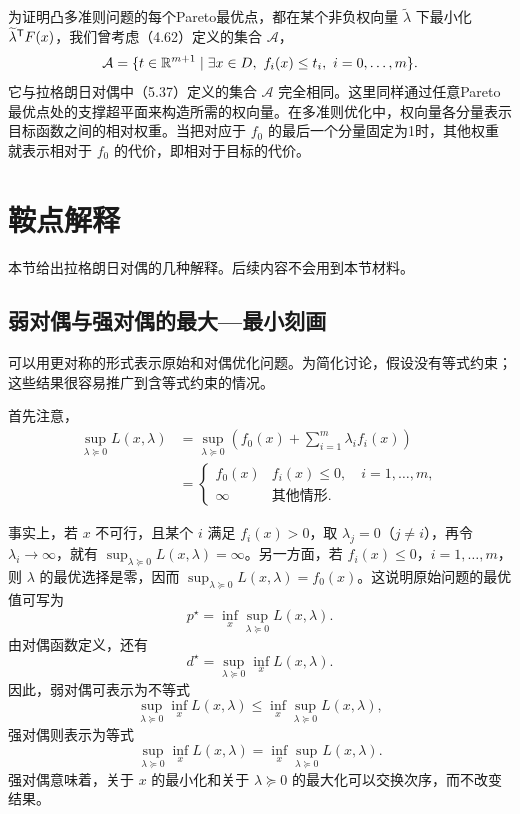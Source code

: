 为证明凸多准则问题的每个Pareto最优点，都在某个非负权向量 $\widetilde\lambda$ 下最小化 $\widetilde\lambda^\mathsf T F(x)$，我们曾考虑（4.62）定义的集合 $\mathcal A$，
\[
\mathcal A=\{t\in\mathbb R^{m+1}\mid\exists x\in D,\ f_i(x)\le t_i,\ i=0,\ldots,m\}.
\]
它与拉格朗日对偶中（5.37）定义的集合 $\mathcal A$ 完全相同。这里同样通过任意Pareto最优点处的支撑超平面来构造所需的权向量。在多准则优化中，权向量各分量表示目标函数之间的相对权重。当把对应于 $f_0$ 的最后一个分量固定为1时，其他权重就表示相对于 $f_0$ 的代价，即相对于目标的代价。

\section{鞍点解释}
本节给出拉格朗日对偶的几种解释。后续内容不会用到本节材料。

\subsection{弱对偶与强对偶的最大—最小刻画}
可以用更对称的形式表示原始和对偶优化问题。为简化讨论，假设没有等式约束；这些结果很容易推广到含等式约束的情况。

首先注意，
\[
\begin{aligned}
\sup_{\lambda\succeq0}L(x,\lambda)
&=\sup_{\lambda\succeq0}\left(f_0(x)+\sum_{i=1}^m\lambda_i f_i(x)\right)\\
&=\begin{cases}
f_0(x)&f_i(x)\le0,\quad i=1,\ldots,m,\\
\infty&\text{其他情形}.
\end{cases}
\end{aligned}
\]

事实上，若 $x$ 不可行，且某个 $i$ 满足 $f_i(x)>0$，取 $\lambda_j=0$（$j\ne i$），再令 $\lambda_i\to\infty$，就有 $\sup_{\lambda\succeq0}L(x,\lambda)=\infty$。另一方面，若 $f_i(x)\le0$，$i=1,\ldots,m$，则 $\lambda$ 的最优选择是零，因而 $\sup_{\lambda\succeq0}L(x,\lambda)=f_0(x)$。这说明原始问题的最优值可写为
\[
p^\star=\inf_x\sup_{\lambda\succeq0}L(x,\lambda).
\]
由对偶函数定义，还有
\[
d^\star=\sup_{\lambda\succeq0}\inf_xL(x,\lambda).
\]
因此，弱对偶可表示为不等式
\begin{equation}
\sup_{\lambda\succeq0}\inf_xL(x,\lambda)
\le\inf_x\sup_{\lambda\succeq0}L(x,\lambda),\tag{5.45}
\end{equation}
强对偶则表示为等式
\[
\sup_{\lambda\succeq0}\inf_xL(x,\lambda)
=\inf_x\sup_{\lambda\succeq0}L(x,\lambda).
\]
强对偶意味着，关于 $x$ 的最小化和关于 $\lambda\succeq0$ 的最大化可以交换次序，而不改变结果。

